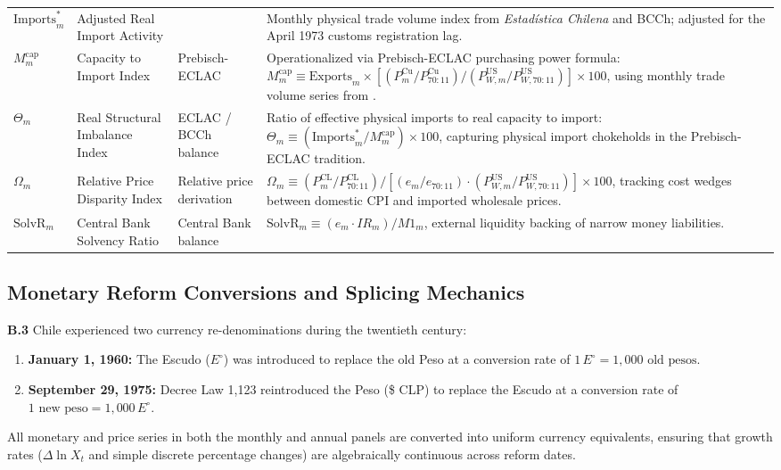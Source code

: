\begin{table}[htbp]
\begin{tabularx}{\textwidth}{p{2.2cm}p{3.0cm}p{2.6cm}X}
$\text{Imports}^*_m$ & Adjusted Real Import Activity & \citet{DiazBahamonde2023} & Monthly physical trade volume index from \textit{Estadística Chilena} and BCCh; adjusted for the April 1973 customs registration lag. \\
$M^{\text{cap}}_m$ & Capacity to Import Index & Prebisch-ECLAC & Operationalized via Prebisch-ECLAC purchasing power formula: $M^{\text{cap}}_m \equiv \text{Exports}_m \times [(P^{\text{Cu}}_m / P^{\text{Cu}}_{70:11}) / (P^{\text{US}}_{W,m} / P^{\text{US}}_{W,70:11})] \times 100$, using monthly trade volume series from \citet{DiazBahamonde2023}. \\
$\Theta_m$ & Real Structural Imbalance Index & ECLAC / BCCh balance & Ratio of effective physical imports to real capacity to import: $\Theta_m \equiv (\text{Imports}^*_m / M^{\text{cap}}_m) \times 100$, capturing physical import chokeholds in the Prebisch-ECLAC tradition. \\
$\Omega_m$ & Relative Price Disparity Index & Relative price derivation & $\Omega_m \equiv (P^{\text{CL}}_m / P^{\text{CL}}_{70:11}) / [(e_m / e_{70:11}) \cdot (P^{\text{US}}_{W,m} / P^{\text{US}}_{W,70:11})] \times 100$, tracking cost wedges between domestic CPI and imported wholesale prices. \\
$\text{SolvR}_m$ & Central Bank Solvency Ratio & Central Bank balance & $\text{SolvR}_m \equiv (e_m \cdot IR_m) / M1_m$, external liquidity backing of narrow money liabilities. \\
\bottomrule
\end{tabularx}
\end{table}

\subsection{Monetary Reform Conversions and Splicing Mechanics}
\label{app:monetary_reforms}

\textbf{B.3} Chile experienced two currency re-denominations during the twentieth century:
\begin{enumerate}[leftmargin=2em]
	\item \textbf{January 1, 1960:} The Escudo ($E^\circ$) was introduced to replace the old Peso at a conversion rate of $1\,E^\circ = 1,000\text{ old pesos}$.
	\item \textbf{September 29, 1975:} Decree Law 1,123 reintroduced the Peso (\$ CLP) to replace the Escudo at a conversion rate of $1\text{ new peso} = 1,000\,E^\circ$.
\end{enumerate}
All monetary and price series in both the monthly and annual panels are converted into uniform currency equivalents, ensuring that growth rates ($\Delta \ln X_t$ and simple discrete percentage changes) are algebraically continuous across reform dates.
